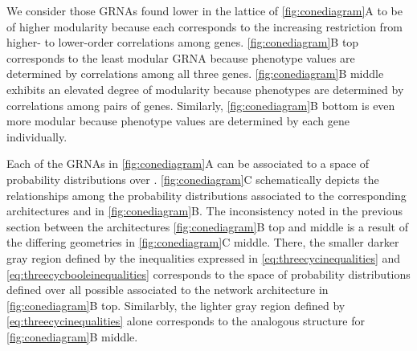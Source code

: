 We consider those GRNAs found lower in the lattice of \ref{fig:conediagram}A to be of higher modularity because each corresponds to the increasing restriction from higher- to lower-order correlations among genes. \ref{fig:conediagram}B top corresponds to the least modular GRNA because phenotype values are determined by correlations among all three genes. \ref{fig:conediagram}B middle exhibits an elevated degree of modularity because phenotypes are determined by correlations among pairs of genes. Similarly, \ref{fig:conediagram}B bottom is even more modular because phenotype values are determined by each gene individually.

Each of the GRNAs in \ref{fig:conediagram}A can be associated to a space of probability distributions over \gnpm{}. \ref{fig:conediagram}C schematically depicts the relationships among the probability distributions associated to the corresponding architectures and \gnpm{} in \ref{fig:conediagram}B. The inconsistency noted in the previous section between the architectures \ref{fig:conediagram}B top and middle is a result of the differing geometries in \ref{fig:conediagram}C middle. There, the smaller darker gray region defined by the inequalities expressed in \ref{eq:threecycinequalities} and \ref{eq:threecycbooleinequalities} corresponds to the space of probability distributions defined over all possible \gnpm{} associated to the network architecture in \ref{fig:conediagram}B top. Similarbly, the lighter gray region defined by \ref{eq:threecycinequalities} alone corresponds to the analogous structure for \ref{fig:conediagram}B middle.


